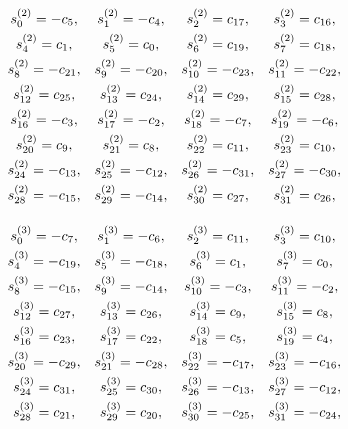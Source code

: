 \documentclass{jtacs}
\numberwithin{equation}{section}
\begin{document}
\begin{center}
\begin{adjustbox}{width=0.57\textwidth, margin=0 0 0 0}
$
\begin{array}{cccc}
\renewcommand*{\arraystretch}{1.5}
\begin{matrix}
s_{0}^{(2)}=-c_{5}, & 	s_{1}^{(2)}=-c_{4}, & 	s_{2}^{(2)}=c_{17}, & 	s_{3}^{(2)}=c_{16}, \\
s_{4}^{(2)}=c_{1}, & 	s_{5}^{(2)}=c_{0}, & 	s_{6}^{(2)}=c_{19}, & 	  s_{7}^{(2)} =c_{18}, \\
s_{8}^{(2)}=-c_{21}, & 	s_{9}^{(2)}=-c_{20}, & 	s_{10}^{(2)}=-c_{23}, & 	s_{11}^{(2)}=-c_{22}, \\ 	  s_{12}^{(2)}=c_{25}, & 	s_{13}^{(2)}=c_{24}, & 	s_{14}^{(2)}=c_{29}, & 	s_{15}^{(2)}=c_{28}, \\
s_{16}^{(2)}=-c_{3}, & 	s_{17}^{(2)}=-c_{2}, & 	s_{18}^{(2)}=-c_{7}, & 	s_{19}^{(2)}=-c_{6}, \\ 	s_{20}^{(2)}=c_{9}, & 	s_{21}^{(2)}=c_{8}, & 	s_{22}^{(2)}=c_{11}, & 	s_{23}^{(2)}=c_{10}, \\
s_{24}^{(2)}=-c_{13}, & 	s_{25}^{(2)}=-c_{12}, & 	s_{26}^{(2)}=-c_{31}, & 	s_{27}^{(2)}=-c_{30}, \\
s_{28}^{(2)}=-c_{15}, & 	s_{29}^{(2)}=-c_{14}, & 	s_{30}^{(2)}=c_{27}, & 	s_{31}^{(2)}=c_{26}, \\
 \end{matrix}
\end{array}
$
\end{adjustbox}
\end{center}

\begin{center}
\begin{adjustbox}{width=0.57\textwidth, margin=0 0 0 0}
$
\begin{array}{cccc}
\renewcommand*{\arraystretch}{1.5}
\begin{matrix}
s_{0}^{(3)}=-c_{7}, & 	s_{1}^{(3)}=-c_{6}, & 	s_{2}^{(3)}=c_{11}, & 	s_{3}^{(3)}=c_{10}, \\
s_{4}^{(3)}=-c_{19}, & 	s_{5}^{(3)}=-c_{18}, & 	s_{6}^{(3)}=c_{1}, & 	  s_{7}^{(3)}=c_{0}, \\
s_{8}^{(3)}=-c_{15}, & 	s_{9}^{(3)}=-c_{14}, & 	s_{10}^{(3)}=-c_{3}, & 	s_{11}^{(3)}=-c_{2}, \\
s_{12}^{(3)}=c_{27}, & 	s_{13}^{(3)}=c_{26}, & 	s_{14}^{(3)}=c_{9}, & 	s_{15}^{(3)}=c_{8}, \\
s_{16}^{(3)}=c_{23}, & 	s_{17}^{(3)}=c_{22}, & 	s_{18}^{(3)}=c_{5}, & 	s_{19}^{(3)}=c_{4}, \\
s_{20}^{(3)}=-c_{29}, & 	s_{21}^{(3)}=-c_{28}, & 	s_{22}^{(3)}=-c_{17}, & 	s_{23}^{(3)} =-c_{16}, \\
s_{24}^{(3)}=c_{31}, & 	s_{25}^{(3)}=c_{30}, & 	s_{26}^{(3)}=-c_{13}, & 	s_{27}^{(3)}=-c_{12}, \\
s_{28}^{(3)}=c_{21}, & 	s_{29}^{(3)}=c_{20}, & 	s_{30}^{(3)}=-c_{25}, & 	s_{31}^{(3)}=-c_{24}, \\

\end{matrix}
\end{array}
$
\end{adjustbox}
\end{center}
\end{document}
